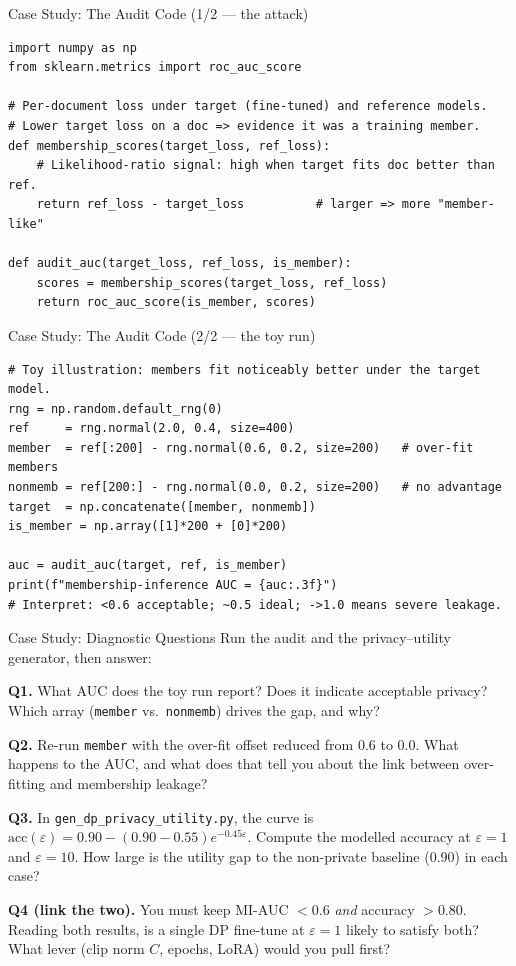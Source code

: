 \documentclass[9pt,t]{beamer}
\begin{document}
\begin{frame}[fragile]{Case Study: The Audit Code (1/2 --- the attack)}
\begin{lstlisting}
import numpy as np
from sklearn.metrics import roc_auc_score

# Per-document loss under target (fine-tuned) and reference models.
# Lower target loss on a doc => evidence it was a training member.
def membership_scores(target_loss, ref_loss):
    # Likelihood-ratio signal: high when target fits doc better than ref.
    return ref_loss - target_loss          # larger => more "member-like"

def audit_auc(target_loss, ref_loss, is_member):
    scores = membership_scores(target_loss, ref_loss)
    return roc_auc_score(is_member, scores)
\end{lstlisting}
\end{frame}

\begin{frame}[fragile]{Case Study: The Audit Code (2/2 --- the toy run)}
\begin{lstlisting}
# Toy illustration: members fit noticeably better under the target model.
rng = np.random.default_rng(0)
ref     = rng.normal(2.0, 0.4, size=400)
member  = ref[:200] - rng.normal(0.6, 0.2, size=200)   # over-fit members
nonmemb = ref[200:] - rng.normal(0.0, 0.2, size=200)   # no advantage
target  = np.concatenate([member, nonmemb])
is_member = np.array([1]*200 + [0]*200)

auc = audit_auc(target, ref, is_member)
print(f"membership-inference AUC = {auc:.3f}")
# Interpret: <0.6 acceptable; ~0.5 ideal; ->1.0 means severe leakage.
\end{lstlisting}
\end{frame}

\begin{frame}{Case Study: Diagnostic Questions}
Run the audit and the privacy--utility generator, then answer:

\medskip
\textbf{Q1.} What AUC does the toy run report? Does it indicate acceptable privacy?
Which array (\texttt{member} vs.\ \texttt{nonmemb}) drives the gap, and why?

\medskip
\textbf{Q2.} Re-run \texttt{member} with the over-fit offset reduced from $0.6$ to
$0.0$. What happens to the AUC, and what does that tell you about the link between
over-fitting and membership leakage?

\medskip
\textbf{Q3.} In \texttt{gen\_dp\_privacy\_utility.py}, the curve is
$\text{acc}(\varepsilon)=0.90-(0.90-0.55)e^{-0.45\varepsilon}$. Compute the modelled
accuracy at $\varepsilon=1$ and $\varepsilon=10$. How large is the utility gap to the
non-private baseline (0.90) in each case?

\medskip
\textbf{Q4 (link the two).} You must keep MI-AUC $<0.6$ \emph{and} accuracy $>0.80$.
Reading both results, is a single DP fine-tune at $\varepsilon=1$ likely to satisfy
both? What lever (clip norm $C$, epochs, LoRA) would you pull first?
\end{frame}
\end{document}

